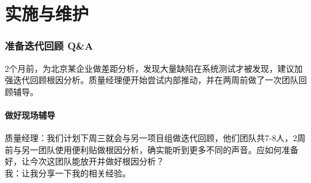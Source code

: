 

\chapter{实施与维护} %

\hypertarget{ux51c6ux5907ux8fedux4ee3ux56deux987e-qa}{%
\subsection{准备迭代回顾
Q\&A}\label{ux51c6ux5907ux8fedux4ee3ux56deux987e-qa}}

2个月前，为北京某企业做差距分析，发现大量缺陷在系统测试才被发现，建议加强迭代回顾根因分析。质量经理便开始尝试内部推动，并在两周前做了一次团队回顾辅导。

\hypertarget{ux505aux597dux73b0ux573aux8f85ux5bfc}{%
\subsubsection{做好现场辅导}\label{ux505aux597dux73b0ux573aux8f85ux5bfc}}

质量经理：我们计划下周三就会与另一项目组做迭代回顾，他们团队共7-8人，2周前与另一团队使用便利贴做根因分析，确实能听到更多不同的声音。应如何准备好，让今次这团队能放开并做好根因分析？\\
我：让我分享一下我的相关经验。\\

